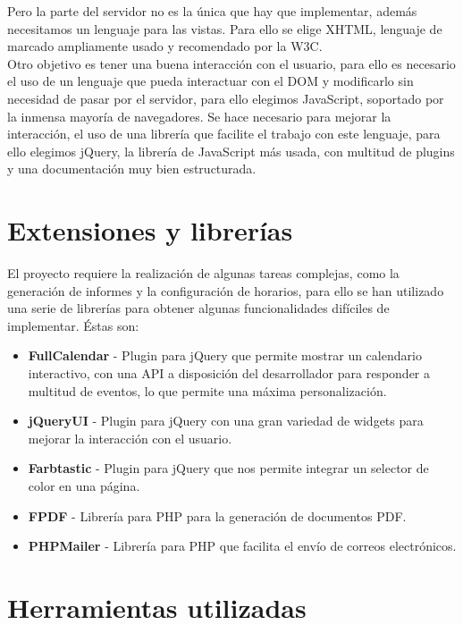 Pero la parte del servidor no es la única que hay que implementar, además necesitamos un lenguaje para las vistas. Para ello se elige XHTML, lenguaje de marcado ampliamente usado y recomendado por la W3C.\\

Otro objetivo es tener una buena interacción con el usuario, para ello es necesario el uso de un lenguaje que pueda interactuar con el DOM y modificarlo sin necesidad de pasar por el servidor, para ello elegimos JavaScript, soportado por la inmensa mayoría de navegadores. Se hace necesario para mejorar la interacción, el uso de una librería que facilite el trabajo con este lenguaje, para ello elegimos jQuery, la librería de JavaScript más usada, con multitud de plugins y una documentación muy bien estructurada.\\

\section{Extensiones y librerías}

El proyecto requiere la realización de algunas tareas complejas, como la generación de informes y la configuración de horarios, para ello se han utilizado una serie de librerías para obtener algunas funcionalidades difíciles de implementar. Éstas son:

\begin{itemize}

\item {\bf FullCalendar} - Plugin para jQuery que permite mostrar un calendario interactivo, con una API a disposición del desarrollador para responder a multitud de eventos, lo que permite una máxima personalización.
\item {\bf jQueryUI} - Plugin para jQuery con una gran variedad de widgets para mejorar la interacción con el usuario.
\item {\bf Farbtastic} - Plugin para jQuery que nos permite integrar un selector de color en una página.
\item {\bf FPDF} - Librería para PHP para la generación de documentos PDF.
\item {\bf PHPMailer} - Librería para PHP que facilita el envío de correos electrónicos.
\end{itemize}

\section{Herramientas utilizadas}


